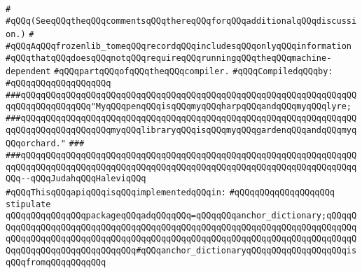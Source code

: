 \verb|#|\newline
\verb|#qQQq(SeeqQQqtheqQQqcommentsqQQqthereqQQqforqQQqadditionalqQQqdiscussion.)|\newline
\verb|#|\newline
\verb|#qQQqAqQQqfrozenlib_tomeqQQqrecordqQQqincludesqQQqonlyqQQqinformation|\newline
\verb|#qQQqthatqQQqdoesqQQqnotqQQqrequireqQQqrunningqQQqtheqQQqmachine-dependent|\newline
\verb|#qQQqpartqQQqofqQQqtheqQQqcompiler.|\newline
\newline
\verb|#qQQqCompiledqQQqby:|\newline
\verb|#qQQqqQQqqQQqqQQqqQQq|\newline
\newline
\newline
\newline
\newline
\newline
\newline
\verb|###qQQqqQQqqQQqqQQqqQQqqQQqqQQqqQQqqQQqqQQqqQQqqQQqqQQqqQQqqQQqqQQqqQQqqQQqqQQqqQQqqQQq"MyqQQqpenqQQqisqQQqmyqQQqharpqQQqandqQQqmyqQQqlyre;|\newline
\verb|###qQQqqQQqqQQqqQQqqQQqqQQqqQQqqQQqqQQqqQQqqQQqqQQqqQQqqQQqqQQqqQQqqQQqqQQqqQQqqQQqqQQqqQQqmyqQQqlibraryqQQqisqQQqmyqQQqgardenqQQqandqQQqmyqQQqorchard."|\newline
\verb|###|\newline
\verb|###qQQqqQQqqQQqqQQqqQQqqQQqqQQqqQQqqQQqqQQqqQQqqQQqqQQqqQQqqQQqqQQqqQQqqQQqqQQqqQQqqQQqqQQqqQQqqQQqqQQqqQQqqQQqqQQqqQQqqQQqqQQqqQQqqQQqqQQqqQQq--qQQqJudahqQQqHaleviqQQq|\newline
\newline
\newline
\verb|#qQQqThisqQQqapiqQQqisqQQqimplementedqQQqin:|\newline
\verb|#qQQqqQQqqQQqqQQqqQQq|\newline
\newline
\verb|stipulate|\newline
\verb|qQQqqQQqqQQqqQQqpackageqQQqadqQQqqQQq=qQQqqQQqanchor_dictionary;qQQqqQQqqQQqqQQqqQQqqQQqqQQqqQQqqQQqqQQqqQQqqQQqqQQqqQQqqQQqqQQqqQQqqQQqqQQqqQQqqQQqqQQqqQQqqQQqqQQqqQQqqQQqqQQqqQQqqQQqqQQqqQQqqQQqqQQqqQQqqQQqqQQqqQQqqQQqqQQqqQQqqQQqqQQq#qQQqanchor_dictionaryqQQqqQQqqQQqqQQqqQQqisqQQqfromqQQqqQQqqQQq|\newline
